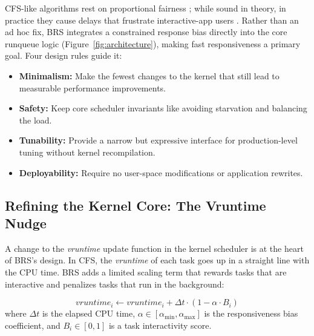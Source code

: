CFS-like algorithms rest on proportional fairness \cite{Bouron2018Battle}; while sound in theory, in practice they cause delays that frustrate interactive-app users \cite{10306992}. Rather than an ad hoc fix, BRS integrates a constrained response bias directly into the core runqueue logic (Figure~\ref{fig:architecture}), making fast responsiveness a primary goal. Four design rules guide it:
\begin{itemize}
 \item \textbf{Minimalism:} Make the fewest changes to the kernel that still lead to measurable performance improvements.
 \item \textbf{Safety:} Keep core scheduler invariants like avoiding starvation and balancing the load.
 \item \textbf{Tunability:} Provide a narrow but expressive interface for  production-level tuning without kernel recompilation.
 \item \textbf{Deployability:} Require no user-space modifications or  application rewrites.
\end{itemize}

\subsection{Refining the Kernel Core: The Vruntime Nudge}
\label{subsec:vruntime-nudge}
A change to the \textit{vruntime} update function in the kernel scheduler is at the heart of BRS's design. In CFS, the \textit{vruntime} of each task goes up in a straight line with the CPU time. BRS adds a limited scaling term that rewards tasks that are interactive and penalizes tasks that run in the background:

\begin{equation}
\label{eq:vruntime-update}
\textit{vruntime}_i \leftarrow \textit{vruntime}_i +
\Delta t \cdot (1 - \alpha \cdot B_i)
\end{equation}
where $\Delta t$ is the elapsed CPU time, $\alpha\in[\alpha_{\min},\alpha_{\max}]$ is the responsiveness bias coefficient, and $B_i\in[0,1]$ is a task interactivity score.


